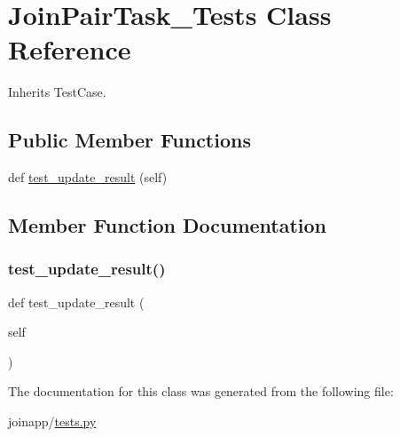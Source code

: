 \hypertarget{classjoinapp_1_1tests_1_1_join_pair_task___tests}{}\section{Join\+Pair\+Task\+\_\+\+Tests Class Reference}
\label{classjoinapp_1_1tests_1_1_join_pair_task___tests}


Inherits Test\+Case.

\subsection*{Public Member Functions}
\begin{DoxyCompactItemize}
\item 
def \mbox{\hyperlink{classjoinapp_1_1tests_1_1_join_pair_task___tests_a1466bd141ad5f6473d022ba00c25dfdb}{test\+\_\+update\+\_\+result}} (self)
\end{DoxyCompactItemize}


\subsection{Member Function Documentation}
\mbox{\label{classjoinapp_1_1tests_1_1_join_pair_task___tests_a1466bd141ad5f6473d022ba00c25dfdb}} 
\subsubsection{\texorpdfstring{test\_update\_result()}{test\_update\_result()}}
{\footnotesize\ttfamily def test\+\_\+update\+\_\+result (\begin{DoxyParamCaption}\item[{}]{self }\end{DoxyParamCaption})}



The documentation for this class was generated from the following file\+:\begin{DoxyCompactItemize}
\item 
joinapp/\mbox{\hyperlink{tests_8py}{tests.\+py}}\end{DoxyCompactItemize}
